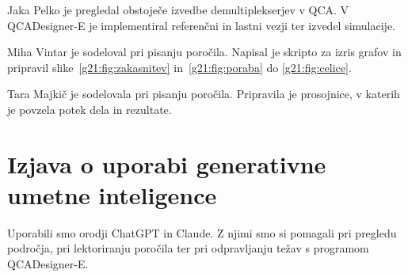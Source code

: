 Jaka Pelko je pregledal obstoječe izvedbe demultiplekserjev v QCA. V QCADesigner-E je implementiral referenčni in lastni vezji ter izvedel simulacije.

Miha Vintar je sodeloval pri pisanju poročila. Napisal je skripto za izris grafov in pripravil slike~\ref{g21:fig:zakasnitev} in~\ref{g21:fig:poraba} do \ref{g21:fig:celice}.

Tara Majkič je sodelovala pri pisanju poročila. Pripravila je prosojnice, v katerih je povzela potek dela in rezultate.

\section*{Izjava o uporabi generativne umetne inteligence}

Uporabili smo orodji ChatGPT in Claude. Z njimi smo si pomagali pri pregledu področja, pri lektoriranju poročila ter pri odpravljanju težav s programom QCADesigner-E.
